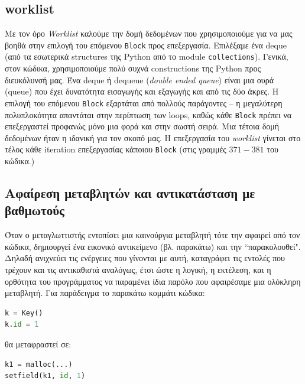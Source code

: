 \subsection{worklist}

Με τον όρο \textit{Worklist} καλούμε την δομή δεδομένων που χρησιμοποιούμε για
να μας βοηθά στην επιλογή του επόμενου \texttt{Block} προς επεξεργασία.
Επιλέξαμε ένα deque\cite{deque} (από τα εσωτερικά structures της Python από το
module \texttt{collections}). Γενικά, στον κώδικα, χρησιμοποιούμε πολύ συχνά
constructions της Python προς διευκόλυνσή μας. Ένα deque ή dequeue
(\textit{double ended queue}) είναι μια ουρά (queue) που έχει δυνατότητα
εισαγωγής και εξαγωγής και από τις δύο άκρες. Η επιλογή του επόμενου
\texttt{Block} εξαρτάται από πολλούς παράγοντες – η μεγαλύτερη πολυπλοκότητα
απαντάται στην περίπτωση των loops, καθώς κάθε \texttt{Block} πρέπει να
επεξεργαστεί προφανώς μόνο μια φορά και στην σωστή σειρά. Μια τέτοια δομή
δεδομένων ήταν η ιδανική για τον σκοπό μας. Η επεξεργασία του \textit{worklist}
γίνεται στο τέλος κάθε iteration επεξεργασίας κάποιου \texttt{Block} (στις
γραμμές $371-381$ του κώδικα.)

\subsection{Αφαίρεση μεταβλητών και αντικατάσταση με βαθμωτούς}

Όταν ο μεταγλωττιστής εντοπίσει μια καινούργια μεταβλητή τότε την αφαιρεί από
τον κώδικα, δημιουργεί ένα εικονικό αντικείμενο (βλ. παρακάτω) και την
``παρακολουθεί". Δηλαδή ανιχνεύει τις ενέργειες που γίνονται με αυτή, καταγράφει
τις εντολές που τρέχουν και τις αντικαθιστά αναλόγως, έτσι ώστε η λογική, η
εκτέλεση, και η ορθότητα του προγράμματος να παραμένει ίδια παρόλο που
αφαιρέσαμε μια ολόκληρη μεταβλητή. Για παράδειγμα το παρακάτω κομμάτι κώδικα:

\begin{lstlisting}[language=Python, deletendkeywords={id}]
k = Key()
k.id = 1
\end{lstlisting}

θα μεταφραστεί σε:

\begin{lstlisting}[language=Python, deletendkeywords={id}, keywords={malloc}]
k1 = malloc(...)
setfield(k1, id, 1)
\end{lstlisting}

